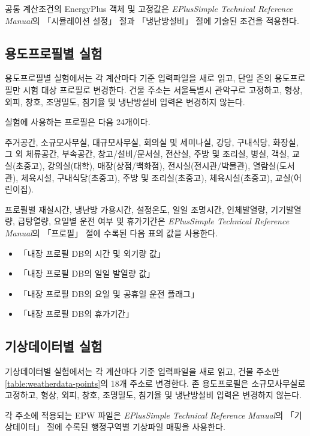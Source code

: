 공통 계산조건의 EnergyPlus 객체 및 고정값은 \textit{EPlusSimple Technical Reference Manual}의 「시뮬레이션 설정」 절과 「냉난방설비」 절에 기술된 조건을 적용한다.

\subsection{용도프로필별 실험}

용도프로필별 실험에서는 각 계산마다 기준 입력파일을 새로 읽고,
단일 존의 용도프로필만 시험 대상 프로필로 변경한다.
건물 주소는 서울특별시 관악구로 고정하고,
형상, 외피, 창호, 조명밀도, 침기율 및 냉난방설비 입력은 변경하지 않는다.

실험에 사용하는 프로필은 다음 24개이다.

{\small
주거공간,
소규모사무실,
대규모사무실,
회의실 및 세미나실,
강당,
구내식당,
화장실,
그 외 체류공간,
부속공간,
창고/설비/문서실,
전산실,
주방 및 조리실,
병실,
객실,
교실(초중고),
강의실(대학),
매장(상점/백화점),
전시실(전시관/박물관),
열람실(도서관),
체육시설,
구내식당(초중고),
주방 및 조리실(초중고),
체육시설(초중고),
교실(어린이집).
}

프로필별 재실시간, 냉난방 가용시간, 설정온도, 일일 조명시간,
인체발열량, 기기발열량, 급탕열량, 요일별 운전 여부 및 휴가기간은
\textit{EPlusSimple Technical Reference Manual}의
「프로필」 절에 수록된 다음 표의 값을 사용한다.

\begin{itemize}
  \item 「내장 프로필 DB의 시간 및 외기량 값」
  \item 「내장 프로필 DB의 일일 발열량 값」
  \item 「내장 프로필 DB의 요일 및 공휴일 운전 플래그」
  \item 「내장 프로필 DB의 휴가기간」
\end{itemize}

\subsection{기상데이터별 실험}

기상데이터별 실험에서는 각 계산마다 기준 입력파일을 새로 읽고, 건물 주소만 \ref{table:weatherdata-points}의 18개 주소로 변경한다.
존 용도프로필은 소규모사무실로 고정하고, 형상, 외피, 창호, 조명밀도, 침기율 및 냉난방설비 입력은 변경하지 않는다.

각 주소에 적용되는 EPW 파일은 \textit{EPlusSimple Technical Reference Manual}의 「기상데이터」 절에 수록된 행정구역별 기상파일 매핑을 사용한다.

